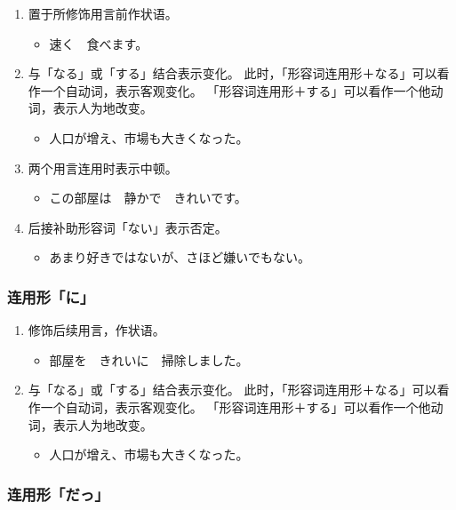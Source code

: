 \begin{enumerate}
  \item 置于所修饰用言前作状语。
    \begin{itemize}
      \item 速く　食べます。
    \end{itemize}
  \item 与「なる」或「する」结合表示变化。
    此时，「形容词连用形＋なる」可以看作一个自动词，表示客观变化。
    「形容词连用形＋する」可以看作一个他动词，表示人为地改变。
    \begin{itemize}
      \item 人口が增え、市場も大きくなった。
    \end{itemize}
  \item 两个用言连用时表示中顿。
    \begin{itemize}
      \item この部屋は　静かで　きれいです。
    \end{itemize}
  \item 后接补助形容词「ない」表示否定。
    \begin{itemize}
      \item あまり好きではないが、さほど嫌いでもない。
    \end{itemize}
\end{enumerate}


\subsubsection{连用形「に」}%

\begin{enumerate}
  \item 修饰后续用言，作状语。
    \begin{itemize}
      \item 部屋を　きれいに　掃除しました。
    \end{itemize}
  \item 与「なる」或「する」结合表示变化。
    此时，「形容词连用形＋なる」可以看作一个自动词，表示客观变化。
    「形容词连用形＋する」可以看作一个他动词，表示人为地改变。
    \begin{itemize}
      \item 人口が增え、市場も大きくなった。
    \end{itemize}
\end{enumerate}


\subsubsection{连用形「だっ」}%

